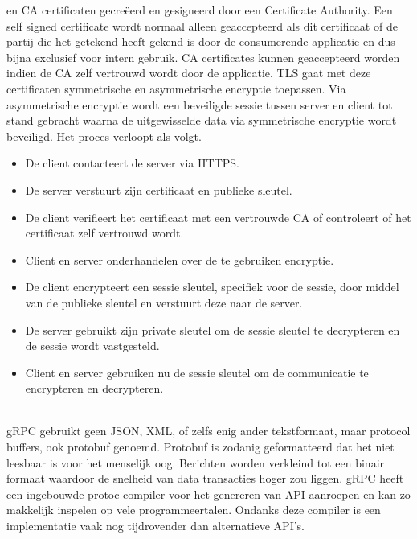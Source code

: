 en CA certificaten gecre\"eerd en gesigneerd door een Certificate Authority. Een self signed certificate wordt normaal alleen geaccepteerd als dit certificaat of de
partij die het getekend heeft gekend is door de consumerende applicatie en dus bijna exclusief voor intern gebruik. CA certificates kunnen geaccepteerd worden indien de
CA zelf vertrouwd wordt door de applicatie.\newline
TLS gaat met deze certificaten symmetrische en asymmetrische encryptie toepassen. Via asymmetrische encryptie wordt een beveiligde sessie tussen server en client tot
stand gebracht waarna de uitgewisselde data via symmetrische encryptie wordt beveiligd. Het proces verloopt als volgt.
\begin{itemize}
    \item De client contacteert de server via HTTPS.
    \item De server verstuurt zijn certificaat en publieke sleutel.
    \item De client verifieert het certificaat met een vertrouwde CA of controleert of het certificaat zelf vertrouwd wordt.
    \item Client en server onderhandelen over de te gebruiken encryptie.
    \item De client encrypteert een sessie sleutel, specifiek voor de sessie, door middel van de publieke sleutel en verstuurt deze naar de server.
    \item De server gebruikt zijn private sleutel om de sessie sleutel te decrypteren en de sessie wordt vastgesteld.
    \item Client en server gebruiken nu de sessie sleutel om de communicatie te encrypteren en decrypteren.
\end{itemize}
~\autocite{githubhttp2,sslcomhttp2tls,browserhttp2support,tlsBasics,grpctls,http11vshttp2,tlsperformance,sslcertificate,sslhandshake}\\


gRPC gebruikt geen JSON, XML, of zelfs enig ander tekstformaat, maar protocol buffers, ook protobuf genoemd. Protobuf is zodanig geformatteerd dat het niet leesbaar is
voor het menselijk oog. Berichten worden verkleind tot een binair formaat waardoor de snelheid van data transacties hoger zou liggen. gRPC heeft een ingebouwde
protoc-compiler voor het genereren van API-aanroepen en kan zo makkelijk inspelen op vele programmeertalen.
Ondanks deze compiler is een implementatie vaak nog tijdrovender dan alternatieve API's.\newline
~\autocite{googleprotobufguide,dreamfactory}
~\\

